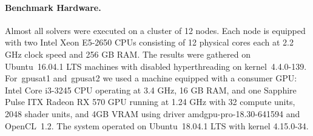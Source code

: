 \documentclass{llncs}
\newcommand{\cSAT}{\textsc{\#Sat}\xspace}%
\newcommand{\WMC}{\textsc{WMC}\xspace}%
\newcommand{\gpusatnu}{{\small\textsf{gpusat2}}\xspace}
\newcommand{\gpusatone}{{\small\textsf{gpusat1}}\xspace}
\begin{document}
%

\paragraph{Benchmark Hardware.}
%
%
%
%
Almost all solvers were executed on a cluster of 12 nodes. Each node is equipped
with two Intel Xeon E5-2650 CPUs consisting of 12 physical cores each
at 2.2 GHz clock speed and 256 GB RAM. %
The results were gathered on Ubuntu~16.04.1 LTS machines with disabled hyperthreading
on kernel~4.4.0-139. %
%
%
For~\gpusatone and~\gpusatnu we used a machine equipped with a consumer GPU:
%
Intel Core i3-3245 CPU operating at 3.4 GHz, 16 GB RAM, and one
Sapphire Pulse ITX Radeon RX 570 GPU running at 1.24 GHz with 32
compute units, 2048 shader units, and 4GB VRAM using driver
amdgpu-pro-18.30-641594 and OpenCL~1.2.
The system operated on Ubuntu~18.04.1 LTS with kernel 4.15.0-34.
%




%
%
%
%
%
%
%
%
%
%
%
%
%
%
%
%
%
%
%
%
%
%
%
%
%
%
%
%
%
%
%
%
%
%
%
\end{document}
